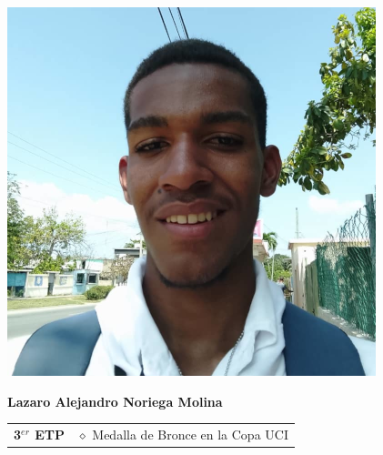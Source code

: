 \begin{minipage}{0.2\textwidth}
	\includegraphics[width=\linewidth]{img/concursantes/lazaro_alejandro.png} %
\end{minipage}
\hfill
\begin{minipage}{0.7\textwidth}
	\textbf{Lazaro Alejandro Noriega Molina}
	
	\vspace*{0.1in}
	\begin{tabular}{rl}
		\textbf{3$^{er}$ ETP} & $\diamond$ Medalla de Bronce en la Copa UCI  \\
	\end{tabular}
\end{minipage}

\vspace*{0.2in}

